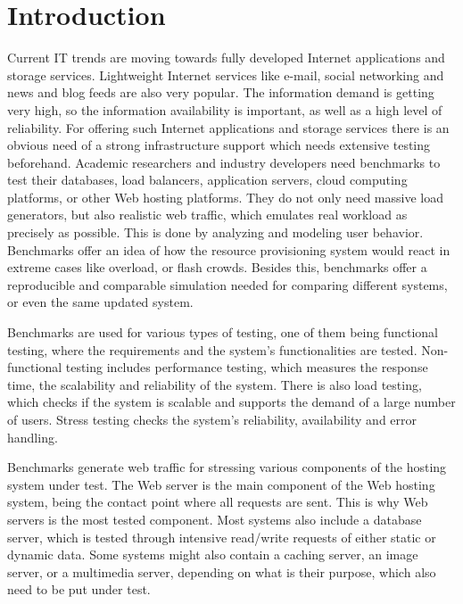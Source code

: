 \chapter{Introduction}
\label{chapter:chapter1}

Current IT trends are moving towards fully developed Internet applications and storage services. Lightweight Internet services like e-mail, social networking and news and blog feeds are also very popular. The information demand is getting very high, so the information availability is important, as well as a high level of reliability. For offering such Internet applications and storage services there is an obvious need of a strong infrastructure support which needs extensive testing beforehand. Academic researchers and industry developers need benchmarks to test their databases, load balancers, application servers, cloud computing platforms, or other Web hosting platforms. They do not only need massive load generators, but also realistic web traffic, which emulates real workload as precisely as possible. This is done by analyzing and modeling user behavior. Benchmarks offer an idea of how the resource provisioning system would react in extreme cases like overload, or flash crowds. Besides this, benchmarks offer a reproducible and comparable simulation needed for comparing different systems, or even the same updated system.

Benchmarks are used for various types of testing, one of them being functional testing, where the requirements and the system's functionalities are tested. Non-functional testing includes performance testing, which measures the response time, the scalability and reliability of the system. There is also load testing, which checks if the system is scalable and supports the demand of a large number of users. Stress testing checks the system's reliability, availability and error handling.

Benchmarks generate web traffic for stressing various components of the hosting system under test. The Web server is the main component of the Web hosting system, being the contact point where all requests are sent. This is why Web servers is the most tested component. Most systems also include a database server, which is tested through intensive read/write requests of either static or dynamic data.  Some systems might also contain a caching server, an image server, or a multimedia server, depending on what is their purpose, which also need to be put under test.

